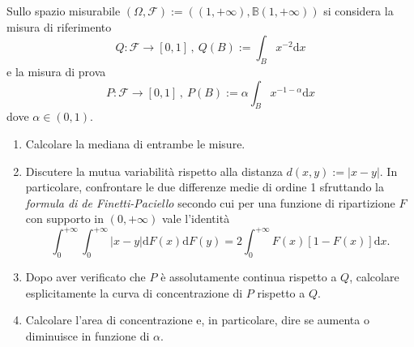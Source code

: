 

\begin{esercizio}[Problema 2, 12/09/2024]
  Sullo spazio misurabile
  \(\left( \Omega, \mathcal{F} \right) := \left( (1, +\infty), \mathbb{B} (1,+\infty) \right)\)
  si considera la misura di riferimento
  \[
    Q : \mathcal{F} \to [0,1] \,,\ Q(B) := \int_{B} x^{-2} \mathrm d x
  \]
  e la misura di prova
  \[
    P : \mathcal{F} \to [0,1] \,,\ P(B) := \alpha \int_{B} x^{-1-\alpha} \mathrm d x
  \]
  dove \(\alpha \in (0,1)\).
  \begin{enumerate}[leftmargin=*]
  \item Calcolare la mediana di entrambe le misure.

  \item Discutere la mutua variabilità rispetto alla distanza
    \(d(x, y) := \left\lvert x-y \right\rvert\). In particolare,
    confrontare le due differenze medie di ordine 1 sfruttando la {\em
      formula di de Finetti-Paciello} secondo cui per una funzione di
    ripartizione \(F\) con supporto in \((0, +\infty)\) vale l'identità
    \[
      \int_{0}^{+\infty} \int_{0}^{+\infty} \left\lvert x-y \right\rvert \mathrm d
      F(x) \mathrm d F(y) = 2 \int_{0}^{+\infty} F(x) [1-F(x)] \mathrm d x .
    \]

  \item Dopo aver verificato che \(P\) è assolutamente continua
    rispetto a \(Q\), calcolare esplicitamente la curva di
    concentrazione di \(P\) rispetto a \(Q\).

  \item Calcolare l'area di concentrazione e, in particolare, dire se
    aumenta o diminuisce in funzione di \(\alpha\).
  \end{enumerate}
\end{esercizio}

